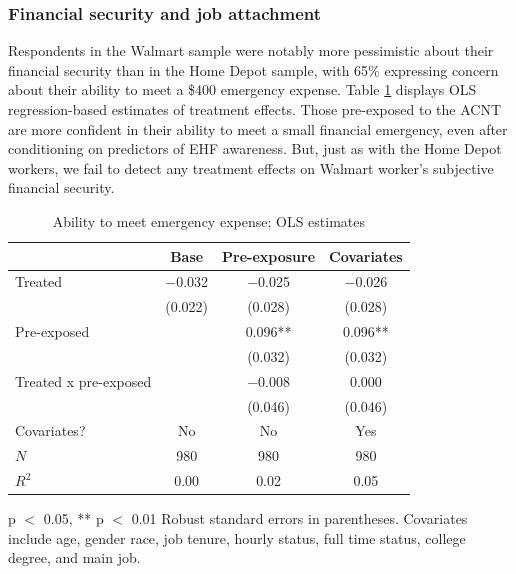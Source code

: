 \documentclass[
  11pt,
  oneside]{article}
\begin{document}
\subsubsection{Financial security and job attachment}\label{financial-security-and-job-attachment}

Respondents in the Walmart sample were notably more pessimistic about their financial security than in the Home Depot sample, with 65\% expressing concern about their ability to meet a \$400 emergency expense. Table \ref{tab:tab-finsec-wmt} displays OLS regression-based estimates of treatment effects. Those pre-exposed to the ACNT are more confident in their ability to meet a small financial emergency, even after conditioning on predictors of EHF awareness. But, just as with the Home Depot workers, we fail to detect any treatment effects on Walmart worker's subjective financial security.

\begin{table}
\centering
\caption{\label{tab:tab-finsec-wmt}Ability to meet emergency expense; OLS estimates \label{tab:tab-finsec-wmt}}
\centering
\begin{threeparttable}
\begin{tabular}[t]{lccc}
\toprule
  & Base & Pre-exposure & Covariates\\
\midrule
Treated & \num{-0.032} & \num{-0.025} & \num{-0.026}\\
 & (\num{0.022}) & (\num{0.028}) & (\num{0.028})\\
Pre-exposed &  & \num{0.096}** & \num{0.096}**\\
 &  & (\num{0.032}) & (\num{0.032})\\
Treated x pre-exposed &  & \num{-0.008} & \num{0.000}\\
 &  & (\num{0.046}) & (\num{0.046})\\
\midrule
Covariates? & No & No & Yes\\
$N$ & \num{980} & \num{980} & \num{980}\\
$R^2$ & \num{0.00} & \num{0.02} & \num{0.05}\\
\bottomrule
\end{tabular}
\begin{tablenotes}
\item * p $<$ 0.05, ** p $<$ 0.01 Robust standard errors in parentheses. Covariates include age, gender race, job tenure, hourly status, full time status, college degree, and main job.
\end{tablenotes}
\end{threeparttable}
\end{table}
\end{document}
